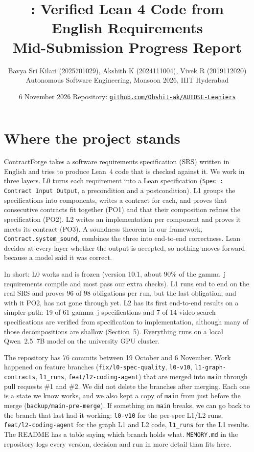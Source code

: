 \documentclass[10pt,a4paper]{article}
\title{\vspace{-1.3cm}\textbf{\cf: Verified Lean 4 Code from English Requirements}\\[2pt]
\large Mid-Submission Progress Report}
\author{Bavya Sri Kilari (2025701029), Akshith K (2024111004), Vivek R (2019112020)\\
\small Autonomous Software Engineering, Monsoon 2026, IIIT Hyderabad}
\date{\small 6 November 2026 \quad Repository: \href{https://github.com/Ohshit-ak/AUTOSE-Leaniers}{\nolinkurl{github.com/Ohshit-ak/AUTOSE-Leaniers}}}
\newcommand{\cf}{ContractForge}
\newcommand{\code}[1]{\texttt{\small #1}}
\begin{document}
\maketitle
\vspace{-0.9cm}

\section{Where the project stands}
\cf{} takes a software requirements specification (SRS) written in English and tries to produce Lean~4 code that is checked against it. We work in three layers. L0 turns each requirement into a Lean specification (\code{Spec : Contract Input Output}, a precondition and a postcondition). L1 groups the specifications into components, writes a contract for each, and proves that consecutive contracts fit together (PO1) and that their composition refines the specification (PO2). L2 writes an implementation per component and proves it meets its contract (PO3). A soundness theorem in our framework, \code{Contract.system\_sound}, combines the three into end-to-end correctness. Lean decides at every layer whether the output is accepted, so nothing moves forward because a model said it was correct.

In short: L0 works and is frozen (version 10.1, about 90\% of the gamma~j requirements compile and most pass our extra checks). L1 runs end to end on the real SRS and proves 96 of 98 obligations per run, but the last obligation, and with it PO2, has not gone through yet. L2 has its first end-to-end results on a simpler path: 19 of 61 gamma~j specifications and 7 of 14 video-search specifications are verified from specification to implementation, although many of those decompositions are shallow (Section~5). Everything runs on a local Qwen~2.5~7B model on the university GPU cluster.

The repository has 76 commits between 19 October and 6 November. Work happened on feature branches (\code{fix/l0-spec-quality}, \code{l0-v10}, \code{l1-graph-contracts}, \code{l1\_runs}, \code{feat/l2-coding-agent}) that are merged into \code{main} through pull requests \#1 and \#2. We did not delete the branches after merging. Each one is a state we know works, and we also kept a copy of \code{main} from just before the merge (\code{backup/main-pre-merge}). If something on \code{main} breaks, we can go back to the branch that last had it working: \code{l0-v10} for the per-spec L1/L2 runs, \code{feat/l2-coding-agent} for the graph L1 and L2 code, \code{l1\_runs} for the L1 results. The README has a table saying which branch holds what. \code{MEMORY.md} in the repository logs every version, decision and run in more detail than fits here.
\end{document}
